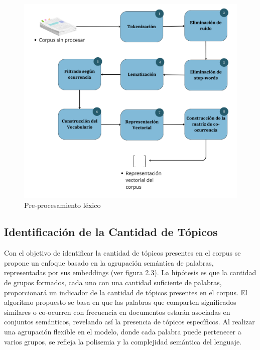 \begin{figure}[H]
	\centering
	\includegraphics[width=12cm]{lexical_prep}
	\caption{Pre-procesamiento l\'exico}
\end{figure}

\subsection{Identificación de la Cantidad de Tópicos}

Con el objetivo de identificar la cantidad de tópicos presentes en el corpus se propone un enfoque basado en la agrupación semántica de palabras, representadas por sus embeddings (ver figura 2.3). La hip\'otesis es que la cantidad de grupos formados, cada uno con una cantidad suficiente de palabras, proporcionará un indicador de la cantidad de tópicos presentes en el corpus. El algoritmo propuesto se basa en que las palabras que comparten significados similares o co-ocurren con frecuencia en documentos estarán asociadas en conjuntos semánticos, revelando así la presencia de tópicos específicos. Al realizar una agrupación flexible  en el modelo, donde cada palabra puede pertenecer a varios grupos, se refleja la polisemia y la complejidad semántica del lenguaje. 

